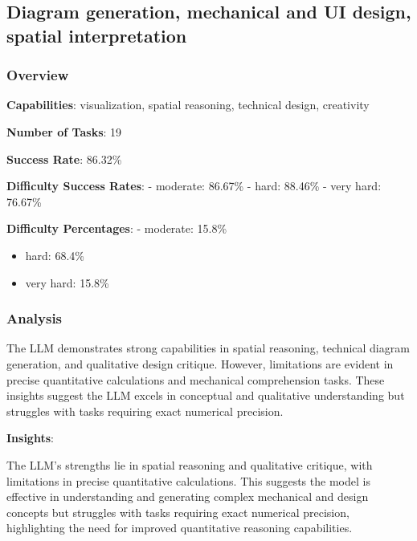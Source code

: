 \documentclass[fleqn,10pt]{wlscirep}
\begin{document}
\hypertarget{diagram-generation-mechanical-and-ui-design-spatial-interpretation}{%
\subsection{Diagram generation, mechanical and UI design, spatial
interpretation}\label{diagram-generation-mechanical-and-ui-design-spatial-interpretation}}

\hypertarget{overview-5}{%
\subsubsection{Overview}\label{overview-5}}

\textbf{Capabilities}: visualization, spatial reasoning, technical
design, creativity

\textbf{Number of Tasks}: 19

\textbf{Success Rate}: 86.32\%

\textbf{Difficulty Success Rates}: - moderate: 86.67\% - hard: 88.46\% -
very hard: 76.67\%

\textbf{Difficulty Percentages}: - moderate: 15.8\%

\begin{itemize}
\item
  hard: 68.4\%
\item
  very hard: 15.8\%
\end{itemize}

\hypertarget{analysis-4}{%
\subsubsection{Analysis}\label{analysis-4}}

The LLM demonstrates strong capabilities in spatial reasoning, technical
diagram generation, and qualitative design critique. However,
limitations are evident in precise quantitative calculations and
mechanical comprehension tasks. These insights suggest the LLM excels in
conceptual and qualitative understanding but struggles with tasks
requiring exact numerical precision.

\textbf{Insights}:

The LLM's strengths lie in spatial reasoning and qualitative critique,
with limitations in precise quantitative calculations. This suggests the
model is effective in understanding and generating complex mechanical
and design concepts but struggles with tasks requiring exact numerical
precision, highlighting the need for improved quantitative reasoning
capabilities.
\end{document}
